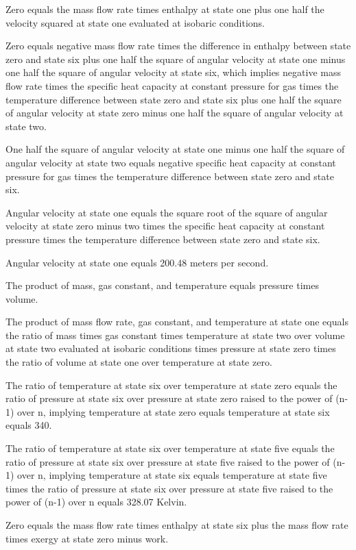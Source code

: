 Zero equals the mass flow rate times enthalpy at state one plus one half the velocity squared at state one evaluated at isobaric conditions.

Zero equals negative mass flow rate times the difference in enthalpy between state zero and state six plus one half the square of angular velocity at state one minus one half the square of angular velocity at state six, which implies negative mass flow rate times the specific heat capacity at constant pressure for gas times the temperature difference between state zero and state six plus one half the square of angular velocity at state zero minus one half the square of angular velocity at state two.

One half the square of angular velocity at state one minus one half the square of angular velocity at state two equals negative specific heat capacity at constant pressure for gas times the temperature difference between state zero and state six.

Angular velocity at state one equals the square root of the square of angular velocity at state zero minus two times the specific heat capacity at constant pressure times the temperature difference between state zero and state six.

Angular velocity at state one equals 200.48 meters per second.

The product of mass, gas constant, and temperature equals pressure times volume.

The product of mass flow rate, gas constant, and temperature at state one equals the ratio of mass times gas constant times temperature at state two over volume at state two evaluated at isobaric conditions times pressure at state zero times the ratio of volume at state one over temperature at state zero.

The ratio of temperature at state six over temperature at state zero equals the ratio of pressure at state six over pressure at state zero raised to the power of (n-1) over n, implying temperature at state zero equals temperature at state six equals 340.

The ratio of temperature at state six over temperature at state five equals the ratio of pressure at state six over pressure at state five raised to the power of (n-1) over n, implying temperature at state six equals temperature at state five times the ratio of pressure at state six over pressure at state five raised to the power of (n-1) over n equals 328.07 Kelvin.

Zero equals the mass flow rate times enthalpy at state six plus the mass flow rate times exergy at state zero minus work.

